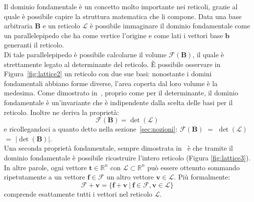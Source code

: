 Il dominio fondamentale è un concetto molto importante nei reticoli, grazie al quale è possibile
capire la struttura matematica che li compone. Data una base arbitraria $\mathbf{B}$ e un reticolo 
$\mathcal{L}$ è possibile immaginare il dominio fondamentale come un parallelepipedo 
che ha come vertice l'origine e come lati i vettori base $\mathbf{b}$ generanti il reticolo. \\
Di tale parallelepipedo è possibile calcolarne il volume $\mathcal{F}(\mathbf{B})$, il 
quale è strettamente legato al determinante del reticolo. 
È possibile osservare in Figura~\ref{fig:lattice2} un reticolo con due sue basi: nonostante 
i domini fondamentali abbiano forme diverse, l'area coperta dal loro volume è la medesima.
Come dimostrato in~\cite[sezione 7.4]{HDMRD08}, proprio come per il
determinante, il dominio fondamentale è un'invariante che è indipendente dalla scelta 
delle basi per il reticolo. Inoltre ne deriva la proprietà:
\[
    \mathcal{F}(\mathbf{B}) = \det(\mathcal{L})
\]
e ricollegandoci a quanto detto nella sezione~\ref{sec:nozioni}: 
$\mathcal{F}(\mathbf{B})$ $=$ $\det(\mathcal{L})$ $=$ $|\det(\mathbf{B})|$.\\
Una seconda proprietà fondamentale, sempre dimostrata in~\cite{HDMRD08} è che tramite il
dominio fondamentale è possibile ricostruire l'intero reticolo (Figura \ref{fig:lattice3}). 
In altre parole, ogni vettore $\mathbf{t} \in \mathbb{R}^n$ con $\mathcal{L} \subset \mathbb{R}^n $ 
può essere ottenuto sommando ripetutamente a un vettore $\mathbf{f} \in \mathcal{F}$ un 
altro vettore $\mathbf{v} \in \mathcal{L}$.
Più formalmente: 
\[
    \mathcal{F} + \mathbf{v} = 
\{ 
    \mathbf{f} + \mathbf{v} \ | \ \mathbf{f} \in \mathcal{F}, \mathbf{v} \in \mathcal{L}
\} 
\]
comprende esattamente tutti i vettori nel reticolo $\mathcal{L}$.

